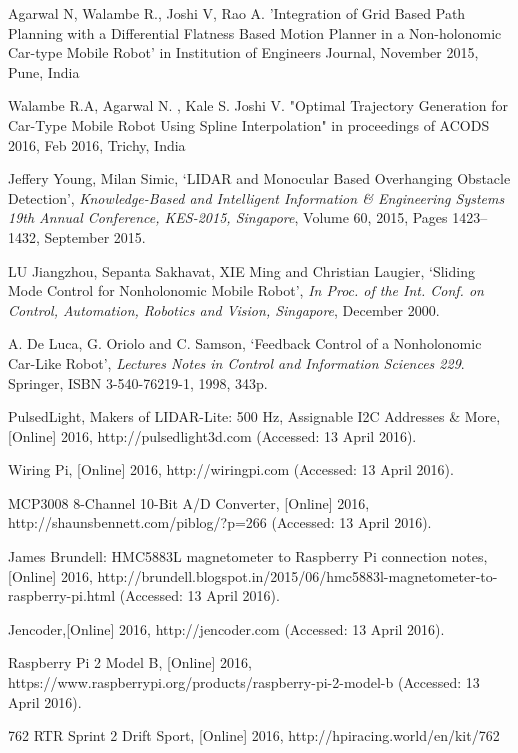 \documentclass[conference]{IEEEtran}
\begin{document}
%
%
%
\begin{thebibliography}{1}

Agarwal N, Walambe R., Joshi V, Rao A. 'Integration of Grid Based Path Planning with a Differential Flatness Based Motion Planner in a Non-holonomic Car-type Mobile Robot' in Institution of Engineers Journal, November 2015, Pune, India 

 Walambe R.A, Agarwal N. , Kale S. Joshi V. "Optimal Trajectory Generation for Car-Type Mobile Robot Using Spline Interpolation" in proceedings of ACODS 2016, Feb 2016, Trichy, India
 
 Jeffery Young, Milan Simic, `LIDAR and Monocular Based Overhanging Obstacle Detection', \textit{Knowledge-Based and Intelligent Information \& Engineering Systems 19th Annual Conference, KES-2015, Singapore}, Volume 60, 2015, Pages 1423–1432, September 2015.

 LU Jiangzhou, Sepanta Sakhavat, XIE Ming and Christian Laugier, `Sliding Mode Control for Nonholonomic Mobile Robot', \textit{In Proc. of the Int. Conf. on Control, Automation, Robotics and Vision, Singapore}, December 2000.
 
 A. De Luca, G. Oriolo and C. Samson,  `Feedback Control of a Nonholonomic Car-Like Robot', \textit{Lectures Notes in Control and Information Sciences 229}. Springer, ISBN 3-540-76219-1, 1998, 343p.
 
 PulsedLight, Makers of LIDAR-Lite: 500 Hz, Assignable I2C Addresses \& More, [Online] 2016,  http://pulsedlight3d.com (Accessed: 13 April 2016).
 
 Wiring Pi, [Online] 2016, http://wiringpi.com (Accessed: 13 April 2016).
 
 MCP3008 8-Channel 10-Bit A/D Converter, [Online] 2016, http://shaunsbennett.com/piblog/?p=266 (Accessed: 13 April 2016).
 
 James Brundell: HMC5883L magnetometer to Raspberry Pi connection notes, [Online] 2016, http://brundell.blogspot.in/2015/06/hmc5883l-magnetometer-to-raspberry-pi.html (Accessed: 13 April 2016).
 
 Jencoder,[Online] 2016, http://jencoder.com (Accessed: 13 April 2016).
 
 Raspberry Pi 2 Model B, [Online] 2016, https://www.raspberrypi.org/products/raspberry-pi-2-model-b (Accessed: 13 April 2016).
 
 762 RTR Sprint 2 Drift Sport,  [Online] 2016, http://hpiracing.world/en/kit/762
\end{thebibliography}
\end{document}
